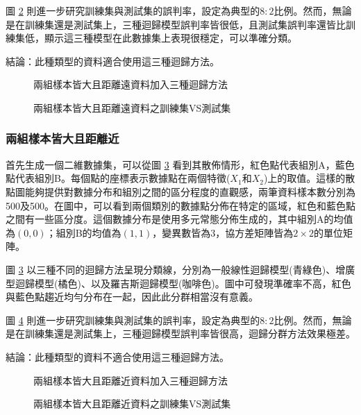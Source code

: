 圖 \ref{fig:rdn5-LARline2} 則進一步研究訓練集與測試集的誤判率，設定為典型的$8:2$比例。然而，無論是在訓練集還是測試集上，三種迴歸模型誤判率皆很低，且測試集誤判率還皆比訓練集低，顯示這三種模型在此數據集上表現很穩定，可以準確分類。

結論：此種類型的資料適合使用這三種迴歸方法。
\begin{figure}[H]
    \caption{兩組樣本皆大且距離遠資料加入三種迴歸方法}
    \label{fig:rdn5-LARline}
\end{figure}
\begin{figure}[H]
    \caption{兩組樣本皆大且距離遠資料之訓練集VS測試集}
    \label{fig:rdn5-LARline2}
\end{figure}
\subsubsection{兩組樣本皆大且距離近}

首先生成一個二維數據集，可以從圖 \ref{fig:rdn6-LARline} 看到其散佈情形，紅色點代表組別A，藍色點代表組別B。每個點的座標表示數據點在兩個特徵($X_1$和$X_2$)上的取值。這樣的散點圖能夠提供對數據分布和組別之間的區分程度的直觀感，兩筆資料樣本數分別為500及500。在圖中，可以看到兩個類別的數據點分佈在特定的區域，紅色和藍色點之間有一些區分度。這個數據分布是使用多元常態分佈生成的，其中組別A的均值為$(0, 0)$；組別B的均值為$(1, 1)$，變異數皆為3，協方差矩陣皆為$2 \times 2$的單位矩陣。

圖 \ref{fig:rdn6-LARline} 以三種不同的迴歸方法呈現分類線，分別為一般線性迴歸模型(青綠色)、增廣型迴歸模型(橘色)、以及羅吉斯迴歸模型(咖啡色)。圖中可發現準確率不高，紅色與藍色點趨近均勻分布在一起，因此此分群相當沒有意義。

圖 \ref{fig:rdn6-LARline2} 則進一步研究訓練集與測試集的誤判率，設定為典型的$8:2$比例。然而，無論是在訓練集還是測試集上，三種迴歸模型誤判率皆很高，迴歸分群方法效果極差。

結論：此種類型的資料不適合使用這三種迴歸方法。
\begin{figure}[H]
    \caption{兩組樣本皆大且距離近資料加入三種迴歸方法}
    \label{fig:rdn6-LARline}
\end{figure}
\begin{figure}[h]
    \caption{兩組樣本皆大且距離近資料之訓練集VS測試集}
    \label{fig:rdn6-LARline2}
\end{figure}



